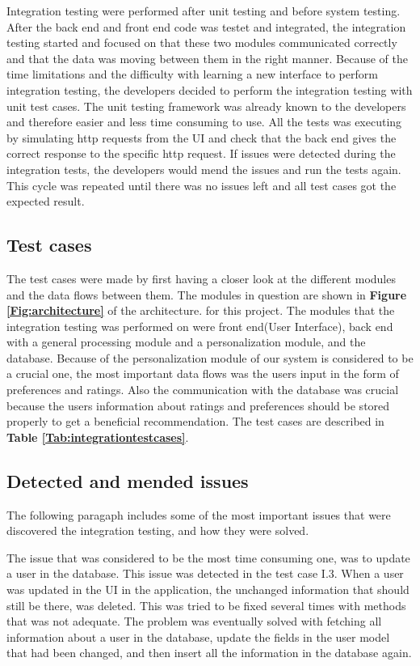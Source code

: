 Integration testing were performed after unit testing and before system testing. After the back end and front end code was testet and integrated, the integration testing started and focused on that these two modules communicated correctly and that the data was moving between them in the right manner. 
Because of the time limitations and the difficulty with learning a new interface to perform integration testing, the developers decided to perform the integration testing with unit test cases. The unit testing framework was already known to the developers and therefore easier and less time consuming to use. All the tests was executing by simulating http requests from the UI and check that the back end gives the correct response to the specific http request. 
If issues were detected during the integration tests, the developers would mend the issues and run the tests again. This cycle was repeated until there was no issues left and all test cases got the expected result. \newline


\subsection{Test cases}
The test cases were made by first having a closer look at the different modules and the data flows between them. The modules in question are shown in \textbf{Figure \ref{Fig:architecture}} of the architecture. for this project. The modules that the integration testing was performed on were front end(User Interface), back end with a general processing module and a personalization module, and the database. Because of the personalization module of our system is considered to be a crucial one, the most important data flows was the users input in the form of preferences and ratings. Also the communication with the database was crucial because the users information about ratings and preferences should be stored properly to get a beneficial recommendation. The test cases are described in \textbf{Table \ref{Tab:integrationtestcases}}.


\subsection{Detected and mended issues}

The following paragaph includes some of the most important issues that were discovered the integration testing, and how they were solved.

The issue that was considered to be the most time consuming one, was to update a user in the database. This issue was detected in the test case I.3. When a user was updated in the UI in the application, the unchanged information that should still be there, was deleted. This was tried to be fixed several times with methods that was not adequate. The problem was eventually solved with fetching all information about a user in the database, update the fields in the user model that had been changed, and then insert all the information in the database again. \newline

